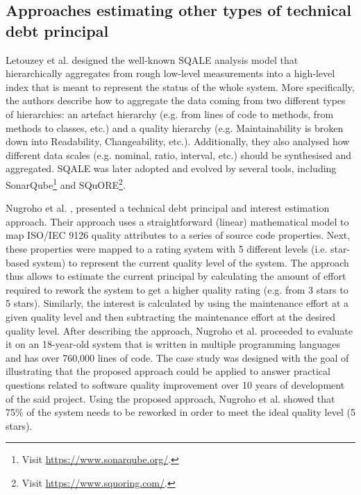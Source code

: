 \subsection{Approaches estimating other types of technical debt principal}\label{c6:sec:related-work-td}
Letouzey et al. \cite{Letouzey2010} designed the well-known SQALE analysis model that hierarchically aggregates from rough low-level measurements into a high-level index that is meant to represent the status of the whole system.
More specifically, the authors describe how to aggregate the data coming from two different types of hierarchies: an artefact hierarchy (e.g. from lines of code to methods, from methods to classes, etc.) and a quality hierarchy (e.g. Maintainability is broken down into Readability, Changeability, etc.).
Additionally, they also analysed how different data scales (e.g. nominal, ratio, interval, etc.) should be synthesised and aggregated.
SQALE was later adopted and evolved by several tools, including SonarQube\footnote{Visit \url{https://www.sonarqube.org/}.} and SQuORE\footnote{Visit \url{https://www.squoring.com/}.}.

Nugroho et al. \cite{Nugroho2011}, presented a technical debt principal and interest estimation approach.
Their approach uses a straightforward (linear) mathematical model to map ISO/IEC 9126 quality attributes to a series of source code properties.
Next, these properties were mapped to a rating system with 5 different levels (i.e. star-based system) to represent the current quality level of the system.
The approach thus allows to estimate the current principal by calculating the amount of effort required to rework the system to get a higher quality rating (e.g. from 3 stars to 5 stars).
Similarly, the interest is calculated by using the maintenance effort at a given quality level and then subtracting the maintenance effort at the desired quality level.
After describing the approach, Nugroho et al. proceeded to evaluate it on an 18-year-old system that is written in multiple programming languages and has over 760,000 lines of code.
The case study was designed with the goal of illustrating that the proposed approach could be applied to answer practical questions related to software quality improvement over 10 years of development of the said project.
Using the proposed approach, Nugroho et al. showed that 75\% of the system needs to be reworked in order to meet the ideal quality level (5 stars).


